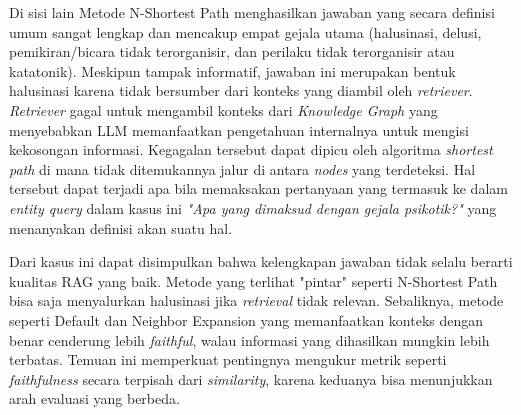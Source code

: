 Di sisi lain Metode N-Shortest Path menghasilkan jawaban yang secara definisi umum sangat lengkap dan mencakup empat gejala utama (halusinasi, delusi, pemikiran/bicara tidak terorganisir, dan perilaku tidak terorganisir atau katatonik).
Meskipun tampak informatif, jawaban ini merupakan bentuk halusinasi karena tidak bersumber dari konteks yang diambil oleh \textit{retriever}.
\textit{Retriever} gagal untuk mengambil konteks dari \textit{Knowledge Graph} yang menyebabkan LLM memanfaatkan pengetahuan internalnya untuk mengisi kekosongan informasi.
Kegagalan tersebut dapat dipicu oleh algoritma \textit{shortest path} di mana tidak ditemukannya jalur di antara \textit{nodes} yang terdeteksi.
Hal tersebut dapat terjadi apa bila memaksakan pertanyaan yang termasuk ke dalam \textit{entity query} dalam kasus ini \textit{"Apa yang dimaksud dengan gejala psikotik?"} yang menanyakan definisi akan suatu hal.

Dari kasus ini dapat disimpulkan bahwa kelengkapan jawaban tidak selalu berarti kualitas RAG yang baik.
Metode yang terlihat "pintar" seperti N-Shortest Path bisa saja menyalurkan halusinasi jika \textit{retrieval} tidak relevan.
Sebaliknya, metode seperti Default dan Neighbor Expansion yang memanfaatkan konteks dengan benar cenderung lebih \textit{faithful}, walau informasi yang dihasilkan mungkin lebih terbatas.
Temuan ini memperkuat pentingnya mengukur metrik seperti \textit{faithfulness} secara terpisah dari \textit{similarity}, karena keduanya bisa menunjukkan arah evaluasi yang berbeda.






